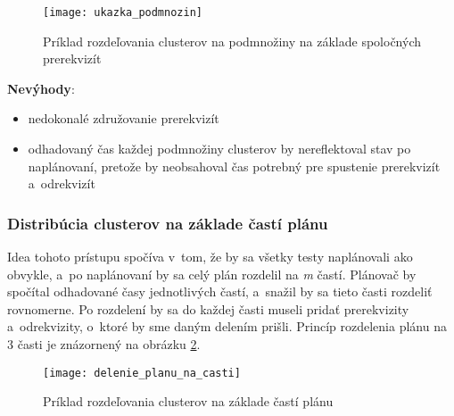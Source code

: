 \begin{figure}[h]
  \begin{center}
    \texttt{[image: ukazka\_podmnozin]}
    \caption{Príklad rozdeľovania clusterov na podmnožiny na základe spoločných prerekvizít}
    \label{obrazok:podmnoziny_testov}
  \end{center}
\end{figure}


\noindent \textbf{Nevýhody}:
\begin{itemize}
\item nedokonalé združovanie prerekvizít 
\item odhadovaný čas každej podmnožiny clusterov by nereflektoval stav po naplánovaní, pretože by
neobsahoval čas potrebný pre spustenie prerekvizít a~odrekvizít
\end{itemize}

\subsubsection*{Distribúcia clusterov na základe častí plánu}
Idea tohoto prístupu spočíva v~tom, že by sa všetky testy naplánovali ako obvykle, a~po naplánovaní by sa
celý plán rozdelil na \emph{m} častí. Plánovač by spočítal odhadované časy jednotlivých častí, a~snažil by sa tieto časti
rozdeliť rovnomerne. Po rozdelení by sa do každej časti museli pridať prerekvizity a~odrekvizity, o~ktoré
by sme daným delením prišli. Princíp rozdelenia plánu na 3 časti je znázornený na obrázku \ref{obrazok:distribucia_na_casti}.

\begin{figure}[h]
  \begin{center}
    \texttt{[image: delenie\_planu\_na\_casti]}
    \caption{Príklad rozdeľovania clusterov na základe častí plánu}
    \label{obrazok:distribucia_na_casti}
  \end{center}
\end{figure}

